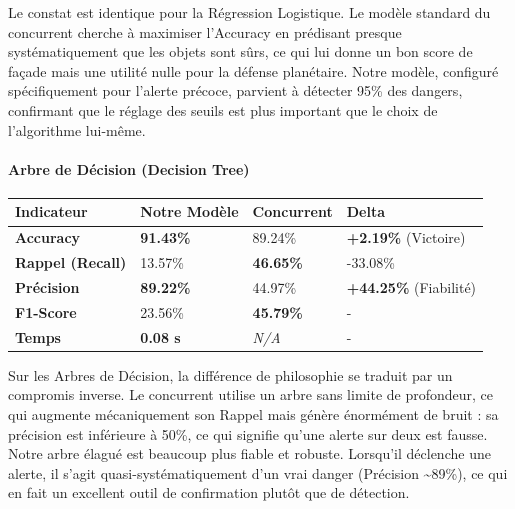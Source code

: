 \documentclass[11pt]{article}
\begin{document}
Le constat est identique pour la Régression Logistique. Le modèle
standard du concurrent cherche à maximiser l'Accuracy en prédisant
presque systématiquement que les objets sont sûrs, ce qui lui donne un
bon score de façade mais une utilité nulle pour la défense planétaire.
Notre modèle, configuré spécifiquement pour l'alerte précoce, parvient à
détecter 95\% des dangers, confirmant que le réglage des seuils est plus
important que le choix de l'algorithme lui-même.

\paragraph{Arbre de Décision (Decision
  Tree)}\label{arbre-de-duxe9cision-decision-tree}

\begin{longtable}[]{@{}llll@{}}
  \toprule\noalign{}
  Indicateur               & Notre Modèle     & Concurrent       & Delta             \\
  \midrule\noalign{}
  \endhead
  \bottomrule\noalign{}
  \endlastfoot
  \textbf{Accuracy}        & \textbf{91.43\%} & 89.24\%          & \textbf{+2.19\%}
  (Victoire)                                                                         \\
  \textbf{Rappel (Recall)} & 13.57\%          & \textbf{46.65\%} & -33.08\%          \\
  \textbf{Précision}       & \textbf{89.22\%} & 44.97\%          & \textbf{+44.25\%}
  (Fiabilité)                                                                        \\
  \textbf{F1-Score}        & 23.56\%          & \textbf{45.79\%} & -                 \\
  \textbf{Temps}           & \textbf{0.08 s}  & \emph{N/A}       & -                 \\
\end{longtable}

Sur les Arbres de Décision, la différence de philosophie se traduit par
un compromis inverse. Le concurrent utilise un arbre sans limite de
profondeur, ce qui augmente mécaniquement son Rappel mais génère
énormément de bruit : sa précision est inférieure à 50\%, ce qui
signifie qu'une alerte sur deux est fausse. Notre arbre élagué est
beaucoup plus fiable et robuste. Lorsqu'il déclenche une alerte, il
s'agit quasi-systématiquement d'un vrai danger (Précision
\textasciitilde89\%), ce qui en fait un excellent outil de confirmation
plutôt que de détection.
\end{document}

